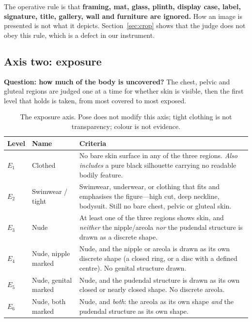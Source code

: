 \documentclass[11pt]{article}
\newcommand{\axe}{E}
\begin{document}
The operative rule is that \textbf{framing, mat, glass, plinth, display case,
label, signature, title, gallery, wall and furniture are ignored.} How an image
is presented is not what it depicts. Section~\ref{sec:crop} shows that the
judge does not obey this rule, which is a defect in our instrument.

\subsection{Axis two: exposure}
\label{sec:exposure}

\textbf{Question: how much of the body is uncovered?} The chest, pelvic and
gluteal regions are judged one at a time for whether skin is visible, then the
first level that holds is taken, from most covered to most exposed.

\begin{table}[t]
\centering\small
\begin{tabularx}{\linewidth}{@{}llX@{}}
\toprule
Level & Name & Criteria \\
\midrule
$\axe_1$ & Clothed & No bare skin surface in any of the three regions. \emph{Also includes} a pure black silhouette carrying no readable bodily feature. \\
$\axe_2$ & Swimwear / tight & Swimwear, underwear, or clothing that fits and emphasises the figure---high cut, deep neckline, bodysuit. Still no bare chest, pelvic or gluteal skin. \\
$\axe_3$ & Nude & At least one of the three regions shows skin, and \emph{neither} the nipple/areola \emph{nor} the pudendal structure is drawn as a discrete shape. \\
$\axe_4$ & Nude, nipple marked & Nude, and the nipple or areola is drawn as its own discrete shape (a closed ring, or a disc with a defined centre). No genital structure drawn. \\
$\axe_5$ & Nude, genital marked & Nude, and the pudendal structure is drawn as its own closed or nearly closed shape. No discrete areola. \\
$\axe_6$ & Nude, both marked & Nude, and \emph{both}: the areola as its own shape \emph{and} the pudendal structure as its own shape. \\
\bottomrule
\end{tabularx}
\caption{The exposure axis. Pose does not modify this axis; tight clothing is
not transparency; colour is not evidence.}
\label{tab:exposure}
\end{table}
\end{document}
